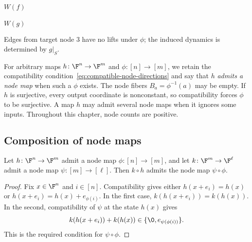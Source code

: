 \begin{example}
\begin{center}
\begin{minipage}{0.45\linewidth}
        \small $W(f)$
    \end{minipage}
    \hfill
    \begin{minipage}{0.45\linewidth}
        \centering

        \small $W(g)$
    \end{minipage}
\end{center}
Edges from target node $3$ have no lifts under $\phi$; the induced dynamics is determined by $g|_S$.
\end{example}

For arbitrary maps $h\colon\F^n\to\F^m$ and $\phi\colon[n]\to[m]$, we retain the compatibility condition~\eqref{eq:compatible-node-directions} and say that $h$ \emph{admits a node map} when such a $\phi$ exists. The node fibers $B_a=\phi^{-1}(a)$ may be empty. If $h$ is surjective, every output coordinate is nonconstant, so compatibility forces $\phi$ to be surjective. A map $h$ may admit several node maps when it ignores some inputs. Throughout this chapter, node counts are positive.

\subsection{Composition of node maps}

\begin{proposition}\label{prop:general-node-map-composition}
Let $h\colon\F^n\to\F^m$ admit a node map $\phi\colon[n]\to[m]$, and let $k\colon\F^m\to\F^\ell$ admit a node map $\psi\colon[m]\to[\ell]$. Then $k\circ h$ admits the node map $\psi\circ\phi$.
\end{proposition}

\begin{proof}
Fix $x\in\F^n$ and $i\in[n]$. Compatibility gives either $h(x+e_i)=h(x)$ or $h(x+e_i)=h(x)+e_{\phi(i)}$. In the first case, $k(h(x+e_i))=k(h(x))$. In the second, compatibility of $\psi$ at the state $h(x)$ gives
\[
    k(h(x+e_i))+k(h(x))
    \in\{\0,e_{\psi(\phi(i))}\}.
\]
This is the required condition for $\psi\circ\phi$.
\end{proof}

